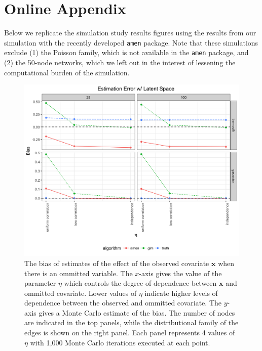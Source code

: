 \documentclass[11pt]{article}
\begin{document}
\newpage
\section*{Online Appendix}
Below we replicate the simulation study results figures using the results from our simulation with the recently developed \texttt{amen} package. Note that these simulations exclude (1) the Poisson family, which is not available in the \texttt{amen} package, and (2) the 50-node networks, which we left out in the interest of lessening the computational burden of the simulation.

\begin{figure}
\includegraphics[width=\textwidth]{figures/estimation_ls_amen.png}
\caption{The bias of estimates of the effect of the observed covariate $\mathbf{x}$ when there is an ommitted variable. The $x$-axis gives the value of the parameter $\eta$ which controls the degree of dependence between $\mathbf{x}$ and ommitted covariate. Lower values of $\eta$ indicate higher levels of dependence between the observed and ommitted covariate. The $y$-axis gives a Monte Carlo estimate of the bias. The number of nodes are indicated in the top panels, while the distributional family of the edges is shown on the right panel. Each panel represents 4 values of $\eta$ with 1,000 Monte Carlo iterations executed at each point.
\label{fig:estimation_ls_amen}}
\end{figure}
\end{document}
